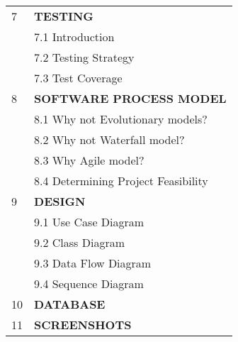 \documentclass[10pt]{article}
\begin{document}
\begin{longtable}{ll}
	\multirow{1}{*}{7} & \textbf{TESTING}\\ 
	& 7.1 Introduction\\
	& 7.2 Testing Strategy\\
	& 7.3 Test Coverage\\\hline

	\multirow{1}{*}{8} & \textbf{SOFTWARE PROCESS MODEL}\\ 
	& 8.1 Why not Evolutionary models?\\
	& 8.2 Why not Waterfall model?\\
	& 8.3 Why Agile model?\\
	& 8.4 Determining Project Feasibility\\ \hline

	\multirow{1}{*}{9} & \textbf{DESIGN}\\ 
	& 9.1 Use Case Diagram \\
	& 9.2 Class Diagram \\
	& 9.3 Data Flow Diagram\\ 
	& 9.4 Sequence Diagram\\ \hline

	\multirow{1}{*}{10} & \textbf{DATABASE}\\ \hline

	\multirow{1}{*}{11} & \textbf{SCREENSHOTS}\\ \hline



\end{longtable}
\end{document}
